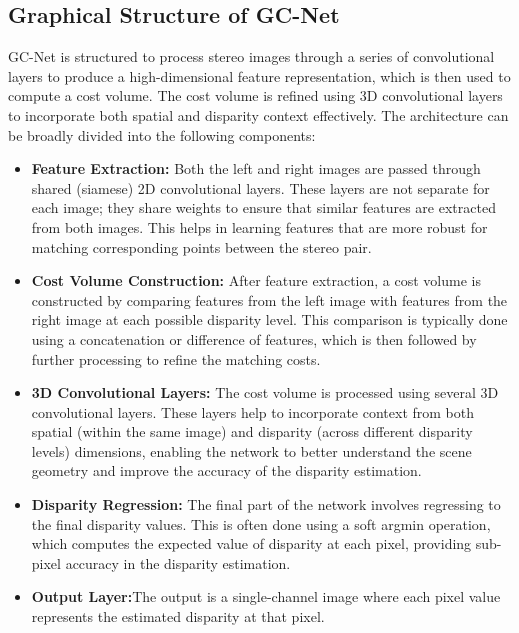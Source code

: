 \documentclass[22pt]{report}
\begin{document}
\subsection{Graphical Structure of GC-Net}
GC-Net is structured to process stereo images through a series of convolutional layers to produce a high-dimensional feature representation, which is then used to compute a cost volume. The cost volume is refined using 3D convolutional layers to incorporate both spatial and disparity context effectively. The architecture can be broadly divided into the following components:
\begin{itemize}
    \item \textbf{Feature Extraction:} Both the left and right images are passed through shared (siamese) 2D convolutional layers. These layers are not separate for each image; they share weights to ensure that similar features are extracted from both images. This helps in learning features that are more robust for matching corresponding points between the stereo pair.
    \item \textbf{Cost Volume Construction:} After feature extraction, a cost volume is constructed by comparing features from the left image with features from the right image at each possible disparity level. This comparison is typically done using a concatenation or difference of features, which is then followed by further processing to refine the matching costs.
    \item \textbf{3D Convolutional Layers:} The cost volume is processed using several 3D convolutional layers. These layers help to incorporate context from both spatial (within the same image) and disparity (across different disparity levels) dimensions, enabling the network to better understand the scene geometry and improve the accuracy of the disparity estimation.
    \item \textbf{Disparity Regression:} The final part of the network involves regressing to the final disparity values. This is often done using a soft argmin operation, which computes the expected value of disparity at each pixel, providing sub-pixel accuracy in the disparity estimation.
    \item \textbf{Output Layer:}The output is a single-channel image where each pixel value represents the estimated disparity at that pixel.
\end{itemize}
\vspace{20}
\end{document}
